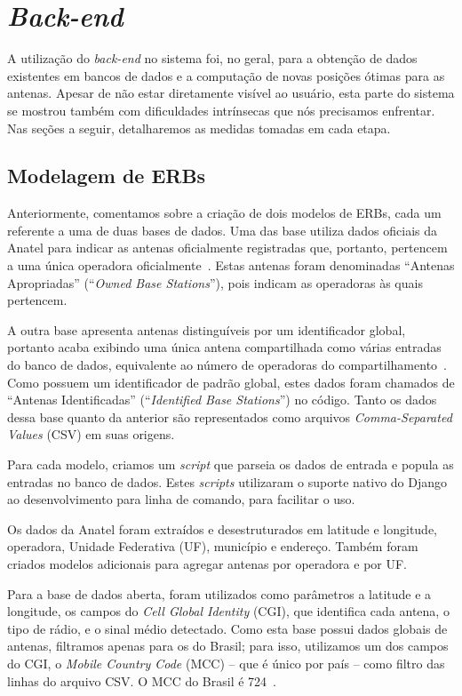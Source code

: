 \documentclass[]{politex}
\begin{document}
\section{\textit{Back-end}}

A utilização do \textit{back-end} no sistema foi, no geral, para a obtenção de
dados existentes em bancos de dados e a computação de novas posições ótimas para
as antenas. Apesar de não estar diretamente visível ao usuário, esta parte do
sistema se mostrou também com dificuldades intrínsecas que nós precisamos
enfrentar. Nas seções a seguir, detalharemos as medidas tomadas em cada etapa.

\subsection{Modelagem de ERBs}

Anteriormente, comentamos sobre a criação de dois modelos de ERBs, cada um
referente a uma de duas bases de dados. Uma das base utiliza dados oficiais da
Anatel para indicar as antenas oficialmente registradas que, portanto, pertencem
a uma única operadora oficialmente~\cite{mapa-erb}. Estas antenas foram
denominadas ``Antenas Apropriadas'' (``\textit{Owned Base Stations}''), pois
indicam as operadoras às quais pertencem.

A outra base apresenta antenas distinguíveis por um identificador global,
portanto acaba exibindo uma única antena compartilhada como várias entradas do
banco de dados, equivalente ao número de operadoras do
compartilhamento~\cite{opencellid}. Como possuem um identificador de padrão
global, estes dados foram chamados de ``Antenas Identificadas''
(``\textit{Identified Base Stations}'') no código. Tanto os dados dessa base
quanto da anterior são representados como arquivos \textit{Comma-Separated
Values} (CSV) em suas origens.

Para cada modelo, criamos um \textit{script} que parseia os dados de entrada e
popula as entradas no banco de dados. Estes \textit{scripts} utilizaram o
suporte nativo do Django ao desenvolvimento para linha de comando, para
facilitar o uso.

Os dados da Anatel foram extraídos e desestruturados em latitude e longitude,
operadora, Unidade Federativa (UF), município e endereço. Também foram criados
modelos adicionais para agregar antenas por operadora e por UF.

Para a base de dados aberta, foram utilizados como parâmetros a latitude e a
longitude, os campos do \textit{Cell Global Identity} (CGI), que identifica cada
antena, o tipo de rádio, e o sinal médio detectado. Como esta base possui dados
globais de antenas, filtramos apenas para os do Brasil; para isso, utilizamos um
dos campos do CGI, o \textit{Mobile Country Code} (MCC) -- que é único por país
-- como filtro das linhas do arquivo CSV. O MCC do Brasil é 724~\cite{mcc-mnc}.
\end{document}
